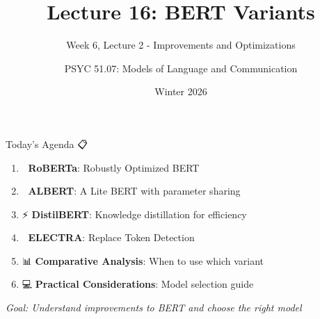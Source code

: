 \documentclass[aspectratio=169]{beamer}
\title{Lecture 16: BERT Variants}
\subtitle{Week 6, Lecture 2 - Improvements and Optimizations}
\author{PSYC 51.07: Models of Language and Communication}
\date{Winter 2026}
\begin{document}
\begin{frame}[shrink=10]
\titlepage
\end{frame}

\begin{frame}[shrink=10]{Today's Agenda 📋}
\large
\begin{enumerate}\setlength{\itemsep}{0pt}
    \item 🚀 \textbf{RoBERTa}: Robustly Optimized BERT
    \item 🔬 \textbf{ALBERT}: A Lite BERT with parameter sharing
    \item ⚡ \textbf{DistilBERT}: Knowledge distillation for efficiency
    \item 🔌 \textbf{ELECTRA}: Replace Token Detection
    \item 📊 \textbf{Comparative Analysis}: When to use which variant
    \item 💻 \textbf{Practical Considerations}: Model selection guide
\end{enumerate}

\vspace{1em}
\textit{Goal: Understand improvements to BERT and choose the right model}
\end{frame}
\end{document}
